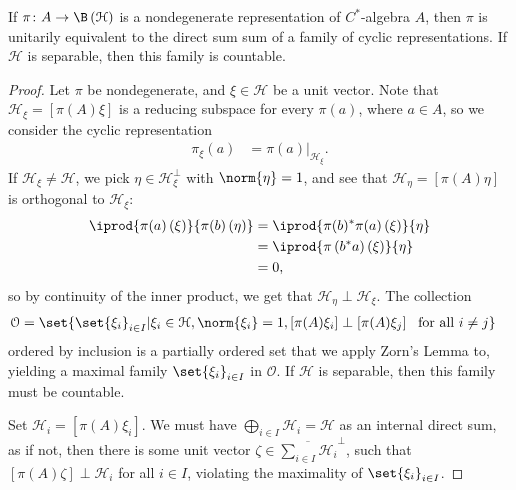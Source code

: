 \documentclass[10pt]{mypackage}
\begin{document}
\begin{lemma}
  If $\pi\colon A\rightarrow \B\left(\mathcal{H}\right)$ is a nondegenerate representation of $C^{\ast}$-algebra $A$, then $\pi$ is unitarily equivalent to the direct sum sum of a family of cyclic representations. If $\mathcal{H}$ is separable, then this family is countable.
\end{lemma}
\begin{proof}
  Let $\pi$ be nondegenerate, and $\xi\in \mathcal{H}$ be a unit vector. Note that $\mathcal{H}_{\xi} = \left[\pi(A)\xi\right]$ is a reducing subspace for every $\pi(a)$, where $a\in A$, so we consider the cyclic representation
  \begin{align*}
    \pi_{\xi}\left(a\right) &= \pi(a)|_{\mathcal{H}_{\xi}}.
  \end{align*}
  If $\mathcal{H}_{\xi}\neq \mathcal{H}$, we pick $\eta\in \mathcal{H}_{\xi}^{\perp}$ with $\norm{\eta} = 1$, and see that $\mathcal{H}_{\eta} = \left[\pi(A)\eta\right]$ is orthogonal to $\mathcal{H}_{\xi}$:
  \begin{align*}
    \iprod{\pi(a)\left(\xi\right)}{\pi(b)\left(\eta\right)} &= \iprod{\pi(b)^{\ast}\pi(a)\left(\xi\right)}{\eta}\\
                                                            &= \iprod{\pi\left(b^{\ast}a\right)\left(\xi\right)}{\eta}\\
                                                            &= 0,
  \end{align*}
  so by continuity of the inner product, we get that $\mathcal{H}_{\eta}\perp \mathcal{H}_{\xi}$. The collection
  \begin{align*}
    \mathcal{O} &= \set{\set{\xi_{i}}_{i\in I} | \xi_i\in \mathcal{H},\norm{\xi_i} = 1,\left[\pi(A)\xi_i\right]\perp \left[\pi(A)\xi_j\right]~\text{ for all }i\neq j}
  \end{align*}
  ordered by inclusion is a partially ordered set that we apply Zorn's Lemma to, yielding a maximal family $\set{\xi_i}_{i\in I}$ in $\mathcal{O}$. If $\mathcal{H}$ is separable, then this family must be countable.\newline

  Set $\mathcal{H}_i = \left[\pi(A)\xi_i\right]$. We must have $\bigoplus_{i\in I}\mathcal{H}_i = \mathcal{H}$ as an internal direct sum, as if not, then there is some unit vector $\zeta \in \overline{\sum_{i\in I}\mathcal{H}_i}^{\perp}$, such that $\left[\pi(A)\zeta\right]\perp \mathcal{H}_i$ for all $i\in I$, violating the maximality of $\set{\xi_i}_{i\in I}$.\newline


\end{proof}
\end{document}
